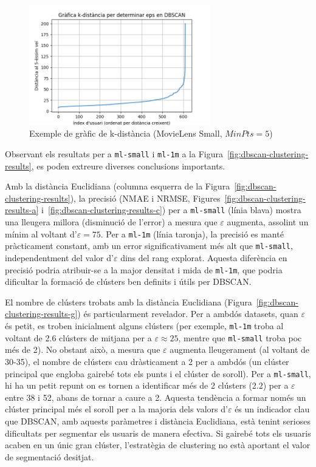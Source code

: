 \documentclass[a4paper,12pt]{report}
\begin{document}
\begin{figure}[H]
    \centering
    \includegraphics[width=0.7\textwidth]{Figuras/DBSCAN/k-distancia-ml-small-5.png}
    \caption{Exemple de gràfic de k-distància (MovieLens Small, \(\mathit{MinPts}=5\))}
    \label{fig:k-distance-example}
\end{figure}

Observant els resultats per a \texttt{ml-small} i \texttt{ml-1m} a la Figura~\ref{fig:dbscan-clustering-results}, es poden extreure diverses conclusions importants.

Amb la distància Euclidiana (columna esquerra de la Figura~\ref{fig:dbscan-clustering-results}), la precisió (NMAE i NRMSE, Figures~\ref{fig:dbscan-clustering-results-a} i~\ref{fig:dbscan-clustering-results-c}) per a \texttt{ml-small} (línia blava) mostra una lleugera millora (disminució de l'error) a mesura que \(\varepsilon\) augmenta, assolint un mínim al voltant d'\(\varepsilon=75\). Per a \texttt{ml-1m} (línia taronja), la precisió es manté pràcticament constant, amb un error significativament més alt que \texttt{ml-small}, independentment del valor d'\(\varepsilon\) dins del rang explorat. Aquesta diferència en precisió podria atribuir-se a la major densitat i mida de \texttt{ml-1m}, que podria dificultar la formació de clústers ben definits i útils per DBSCAN.

El nombre de clústers trobats amb la distància Euclidiana (Figura~\ref{fig:dbscan-clustering-results-g}) és particularment revelador. Per a ambdós datasets, quan \(\varepsilon\) és petit, es troben inicialment alguns clústers (per exemple, \texttt{ml-1m} troba al voltant de 2.6 clústers de mitjana per a \(\varepsilon \approx 25\), mentre que \texttt{ml-small} troba poc més de 2). No obstant això, a mesura que \(\varepsilon\) augmenta lleugerament (al voltant de 30-35), el nombre de clústers cau dràsticament a 2 per a ambdós (un clúster principal que engloba gairebé tots els punts i el clúster de soroll). Per a \texttt{ml-small}, hi ha un petit repunt on es tornen a identificar més de 2 clústers (2.2) per a \(\varepsilon\) entre 38 i 52, abans de tornar a caure a 2. Aquesta tendència a formar només un clúster principal més el soroll per a la majoria dels valors d'\(\varepsilon\) és un indicador clau que DBSCAN, amb aquests paràmetres i distància Euclidiana, està tenint serioses dificultats per segmentar els usuaris de manera efectiva. Si gairebé tots els usuaris acaben en un únic gran clúster, l'estratègia de clustering no està aportant el valor de segmentació desitjat.
\end{document}
